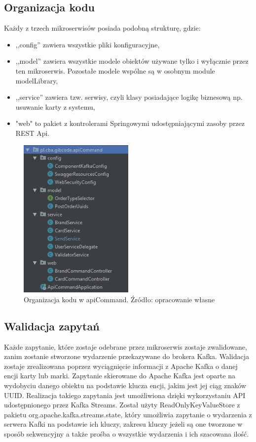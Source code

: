 \subsection{Organizacja kodu}
Każdy z trzech mikroserwisów posiada podobną strukturę, gdzie:

\begin{itemize}
    \item ,,config'' zawiera wszystkie pliki konfiguracyjne,
    \item ,,model'' zawiera wszystkie modele obiektów używane tylko i wyłącznie przez ten mikroserwis. Pozostałe modele wspólne są w osobnym module modelLibrary,
    \item ,,service'' zawiera tzw. serwisy, czyli klasy posiadające logikę biznesową np. usuwanie karty z systemu, 
    \item "web" to pakiet z kontrolerami Springowymi udostępniającymi zasoby przez REST Api.
\end{itemize}


\begin{figure}[h!]
  \centering
    \includegraphics[width=0.5\textwidth]{images/apiCommand_packages.JPG}
  \caption{Organizacja kodu w apiCommand. Źródło: opracowanie własne }
\end{figure}
\FloatBarrier

\subsection{Walidacja zapytań}
Każde zapytanie, które zostaje odebrane przez mikroserwis zostaje zwalidowane, zanim zostanie stworzone wydarzenie przekazywane do brokera Kafka. Walidacja zostaje zrealizowana poprzez wyciągnięcie informacji z Apache Kafka o danej encji karty lub marki. Zapytanie skierowane do Apache Kafka jest oparte na wydobyciu danego obiektu na podstawie klucza encji, jakim jest jej ciąg znaków UUID. Realizacja takiego zapytania jest umożliwiona dzięki wykorzystaniu API udostępnionego przez Kafka Streams. Został użyty ReadOnlyKeyValueStore z pakietu org.apache.kafka.streams.state, który umożliwia zapytanie o wydarzenia z serwera Kafki na podstawie ich kluczy, zakresu kluczy jeżeli są one tworzone w sposób sekwencyjny a także prośba o wszystkie wydarzenia i ich szacowana ilość.

